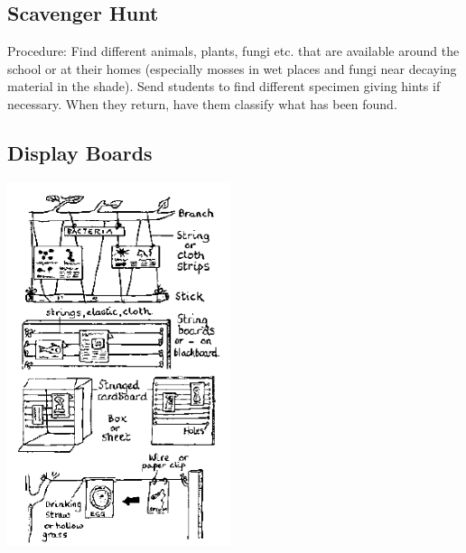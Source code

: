 \begin{multicols}{2}
\subsection{Scavenger Hunt} %


\begin{description*}
\item[Procedure:]{Find different animals, plants, fungi etc. that are available around the school or at their homes (especially mosses in wet places and fungi near decaying material in the shade). Send students to find different specimen giving hints if necessary. When they return, have them classify what has been found.}
\end{description*}

\subsection{Display Boards} %

\begin{center}
\includegraphics[width=0.49\textwidth]{./img/source/displays.png}
\end{center}


\end{multicols}
